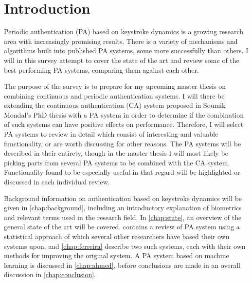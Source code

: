 \documentclass[informationsecurity]{gucmasterproject}
\begin{document}
\thesisdate{\gucmasterthesisdate}
\makefrontpages %





\begin{abstract}


\end{abstract}


\tableofcontents
\chapter{Introduction}
\label{chap:introduction}

Periodic authentication (PA) based on keystroke dynamics is a growing research area with increasingly promising results.
There is a variety of mechanisms and algorithms built into published PA systems, some more successfully than others.
I will in this survey attempt to cover the state of the art and review some of the best performing PA systems, comparing them against each other.

The purpose of the survey is to prepare for my upcoming master thesis on combining continuous and periodic authentication systems.
I will there be extending the continuous authentication (CA) system proposed in Soumik Mondal's PhD thesis \cite{mondal} with a PA system in order to determine if the combination of such systems can have positive effects on performance.
Therefore, I will select PA systems to review in detail which consist of interesting and valuable functionality, or are worth discussing for other reasons.
The PA systems will be described in their entirety, though in the master thesis I will most likely be picking parts from several PA systems to be combined with the CA system.
Functionality found to be especially useful in that regard will be highlighted or discussed in each individual review.

Background information on authentication based on keystroke dynamics will be given in \cref{chap:background}, including an introductory explanation of biometrics and relevant terms used in the research field.
In \cref{chap:state}, an overview of the general state of the art will be covered.
 contains a review of PA system using a statistical approach of which several other researchers have based their own systems upon.
 and \cref{chap:ferreira} describe two such systems, each with their own methods for improving the original system.
A PA system based on machine learning is discussed in \cref{chap:ahmed}, before conclusions are made in an overall discussion in \cref{chap:conclusion}.
\end{document}
